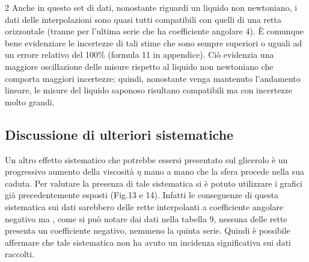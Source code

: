 \documentclass{article}
\begin{document}
\begin{multicols}{2}
Anche in questo set di dati, nonostante riguardi un liquido non newtoniano, i dati delle interpolazioni sono quasi tutti compatibili con quelli di una retta orizzontale (tranne per l'ultima serie che ha coefficiente angolare 4). È comunque bene evidenziare le incertezze di tali stime che sono sempre superiori o uguali ad un errore relativo del 100\% (formula 11 in appendice). Ciò evidenzia una maggiore oscillazione delle misure rispetto al liquido non newtoniano che comporta maggiori incertezze; quindi, nonostante venga mantenuto l'andamento lineare, le misure del liquido saponoso risultano compatibili ma con incertezze molto grandi.
\subsection{Discussione di ulteriori sistematiche}
Un altro effetto sistematico che potrebbe essersi presentato sul glicerolo è un progressivo aumento della viscosità $\eta$ mano a mano che la sfera procede nella sua caduta. Per valutare la presenza di tale sistematica si è potuto utilizzare i grafici già precedentemente esposti (Fig.13 e 14). Infatti le conseguenze di questa sistematica sui dati sarebbero delle rette interpolanti a coefficiente angolare negativo ma , come si può notare dai dati nella tabella 9, nessuna delle rette presenta un coefficiente negativo, nemmeno la quinta serie. Quindi è possibile affermare che tale sistematica non ha avuto un incidenza significativa sui dati raccolti.


\end{multicols}
\end{document}
